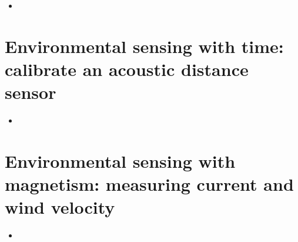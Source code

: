 

\vspace{4cm}





\begin{itemize}
	\item  
\end{itemize}


\section{Environmental sensing with time: calibrate an acoustic distance sensor}
\begin{itemize}
	\item  
\end{itemize}

\section{Environmental sensing with magnetism: measuring current and wind velocity}
\begin{itemize}
	\item  
\end{itemize}









